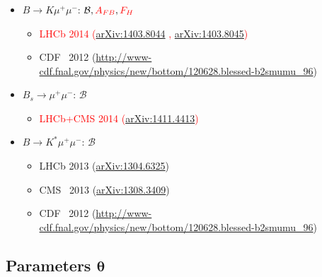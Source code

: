 \documentclass[english]{beamer}
\newcommand{\slide}[2][t]{\begin{frame}[#1] \frametitle{\insertsubsectionhead} #2 \end{frame}}
\newcommand{\red}[1]{\textcolor{red}{#1}}
\begin{document}
\slide[c]{

    \begin{itemize}
        \item $B\rightarrow K\mu^+\mu^-$: $\mathcal{B} , \red{A_{FB}} , \red{F_H}$
        \begin{itemize}
            \item \red{LHCb 2014 {\tiny (\href{http://arXiv.org/abs/1403.8044}{arXiv:1403.8044} , \href{http://arXiv.org/abs/1403.8045}{arXiv:1403.8045})}}
            \item CDF~ 2012 {\tiny (\url{http://www-cdf.fnal.gov/physics/new/bottom/120628.blessed-b2smumu_96})}
        \end{itemize}

        \item $B_s\rightarrow\mu^+\mu^-$: $\mathcal{B}$

        \begin{itemize}
            \item \red{LHCb+CMS 2014 {\tiny({\href{http://arXiv.org/abs/1411.4413}{arXiv:1411.4413}})}}
        \end{itemize}

        \item $B\rightarrow K^\ast\mu^+\mu^-$: $\mathcal{B}$

        \begin{itemize}
            \item LHCb 2013 {\tiny({\href{http://arXiv.org/abs/1304.6325}{arXiv:1304.6325}})}
            \item CMS~ 2013 {\tiny({\href{http://arXiv.org/abs/1308.3409}{arXiv:1308.3409}})}
            \item CDF~ 2012 {\tiny (\url{http://www-cdf.fnal.gov/physics/new/bottom/120628.blessed-b2smumu_96})}
        \end{itemize}
    \end{itemize}

}

\subsection{Parameters $\boldsymbol{\theta}$}
\end{document}
